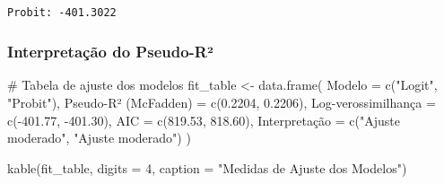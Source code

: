 \documentclass[
  letterpaper,
  DIV=11,
  numbers=noendperiod]{scrartcl}
\newenvironment{Shaded}{\begin{snugshade}}{\end{snugshade}}
\newcommand{\AttributeTok}[1]{\textcolor[rgb]{0.40,0.45,0.13}{#1}}
\newcommand{\CommentTok}[1]{\textcolor[rgb]{0.37,0.37,0.37}{#1}}
\newcommand{\DecValTok}[1]{\textcolor[rgb]{0.68,0.00,0.00}{#1}}
\newcommand{\FloatTok}[1]{\textcolor[rgb]{0.68,0.00,0.00}{#1}}
\newcommand{\FunctionTok}[1]{\textcolor[rgb]{0.28,0.35,0.67}{#1}}
\newcommand{\NormalTok}[1]{\textcolor[rgb]{0.00,0.23,0.31}{#1}}
\newcommand{\OtherTok}[1]{\textcolor[rgb]{0.00,0.23,0.31}{#1}}
\newcommand{\SpecialCharTok}[1]{\textcolor[rgb]{0.37,0.37,0.37}{#1}}
\newcommand{\StringTok}[1]{\textcolor[rgb]{0.13,0.47,0.30}{#1}}
\begin{document}
\begin{verbatim}

Probit: -401.3022
\end{verbatim}

\subsubsection{Interpretação do
Pseudo-R²}\label{interpretauxe7uxe3o-do-pseudo-ruxb2}

\begin{Shaded}
\begin{Highlighting}[]
\CommentTok{\# Tabela de ajuste dos modelos}
\NormalTok{fit\_table }\OtherTok{\textless{}{-}} \FunctionTok{data.frame}\NormalTok{(}
  \AttributeTok{Modelo =} \FunctionTok{c}\NormalTok{(}\StringTok{"Logit"}\NormalTok{, }\StringTok{"Probit"}\NormalTok{),}
  \StringTok{\textasciigrave{}}\AttributeTok{Pseudo{-}R² (McFadden)}\StringTok{\textasciigrave{}} \OtherTok{=} \FunctionTok{c}\NormalTok{(}\FloatTok{0.2204}\NormalTok{, }\FloatTok{0.2206}\NormalTok{),}
  \StringTok{\textasciigrave{}}\AttributeTok{Log{-}verossimilhança}\StringTok{\textasciigrave{}} \OtherTok{=} \FunctionTok{c}\NormalTok{(}\SpecialCharTok{{-}}\FloatTok{401.77}\NormalTok{, }\SpecialCharTok{{-}}\FloatTok{401.30}\NormalTok{),}
  \AttributeTok{AIC =} \FunctionTok{c}\NormalTok{(}\FloatTok{819.53}\NormalTok{, }\FloatTok{818.60}\NormalTok{),}
  \StringTok{\textasciigrave{}}\AttributeTok{Interpretação}\StringTok{\textasciigrave{}} \OtherTok{=} \FunctionTok{c}\NormalTok{(}\StringTok{"Ajuste moderado"}\NormalTok{, }\StringTok{"Ajuste moderado"}\NormalTok{)}
\NormalTok{)}

\FunctionTok{kable}\NormalTok{(fit\_table, }\AttributeTok{digits =} \DecValTok{4}\NormalTok{, }\AttributeTok{caption =} \StringTok{"Medidas de Ajuste dos Modelos"}\NormalTok{)}
\end{Highlighting}
\end{Shaded}
\end{document}
